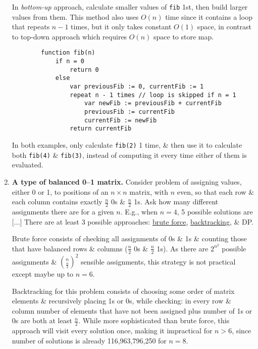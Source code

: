 \documentclass{article}
\begin{document}
\begin{enumerate}
	In {\it bottom-up} approach, calculate smaller values of {\tt fib} 1st, then build larger values from them. This method also uses $O(n)$ time since it contains a loop that repeats $n - 1$ times, but it only takes constant $O(1)$ space, in contrast to top-down approach which requires $O(n)$ space to store map.
	\begin{verbatim}
		function fib(n)
		    if n = 0
		        return 0
		    else
		        var previousFib := 0, currentFib := 1
		        repeat n - 1 times // loop is skipped if n = 1
		            var newFib := previousFib + currentFib
		            previousFib := currentFib
		            currentFib := newFib
		        return currentFib
	\end{verbatim}
	In both examples, only calculate {\tt fib(2)} 1 time, \& then use it to calculate both {\tt fib(4)} \& {\tt fib(3)}, instead of computing it every time either of them is evaluated.	
	\item {\bf A type of balanced 0--1 matrix.} Consider problem of assigning values, either 0 or 1, to positions of an $n\times n$ matrix, with $n$ even, so that each row \& each column contains exactly $\frac{n}{2}$ 0s \& $\frac{n}{2}$ 1s. Ask how many different assignments there are for a given $n$. E.g., when $n = 4$, 5 possible solutions are [$\ldots$] There are at least 3 possible approaches: \href{https://en.wikipedia.org/wiki/Brute-force_search}{brute force}, \href{https://en.wikipedia.org/wiki/Backtracking}{backtracking}, \& DP.
	
	Brute force consists of checking all assignments of 0s \& 1s \& counting those that have balanced rows \& columns ($\frac{n}{2}$ 0s \& $\frac{n}{2}$ 1s). As there are $2^{n^2}$ possible assignments \& $\binom{n}{\frac{n}{2}}^2$ sensible assignments, this strategy is not practical except maybe up to $n = 6$.
	
	Backtracking for this problem consists of choosing some order of matrix elements \& recursively placing 1s or 0s, while checking: in every row \& column number of elements that have not been assigned plus number of 1s or 0s are both at least $\frac{n}{2}$. While more sophisticated than brute force, this approach will visit every solution once, making it impractical for $n > 6$, since number of solutions is already 116,963,796,250 for $n = 8$.
	

\end{enumerate}
\end{document}
